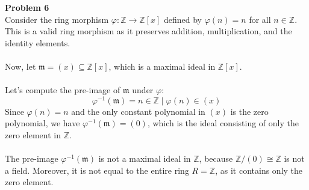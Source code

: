 \documentclass{article}
\begin{document}
\noindent \textbf{Problem 6} \\
Consider the ring morphism $\varphi: \mathbb{Z} \rightarrow \mathbb{Z}[x]$ defined by $\varphi(n) = n$ for all $n \in \mathbb{Z}$. This is a valid ring morphism as it preserves addition, multiplication, and the identity elements.\\\\
Now, let $\mathfrak{m} = (x) \subseteq \mathbb{Z}[x]$, which is a maximal ideal in $\mathbb{Z}[x]$.\\\\
Let's compute the pre-image of $\mathfrak{m}$ under $\varphi$:
$$\varphi^{-1}(\mathfrak{m}) = {n \in \mathbb{Z} \mid \varphi(n) \in (x)}$$
Since $\varphi(n) = n$ and the only constant polynomial in $(x)$ is the zero polynomial, we have $\varphi^{-1}(\mathfrak{m}) = (0)$, which is the ideal consisting of only the zero element in $\mathbb{Z}$.\\\\
The pre-image $\varphi^{-1}(\mathfrak{m})$ is not a maximal ideal in $\mathbb{Z}$, because $\mathbb{Z}/(0) \cong \mathbb{Z}$ is not a field. Moreover, it is not equal to the entire ring $R=\mathbb{Z}$, as it contains only the zero element.\\\\
\end{document}
